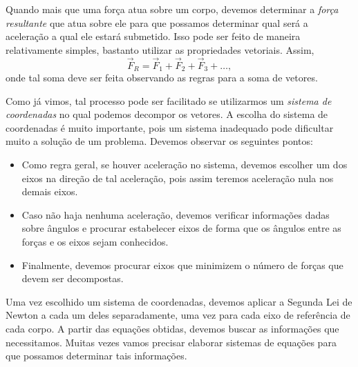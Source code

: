 Quando mais que uma força atua sobre um corpo, devemos determinar a \emph{força resultante} que atua sobre ele para que possamos determinar qual será a aceleração a qual ele estará submetido. Isso pode ser feito de maneira relativamente simples, bastanto utilizar as propriedades vetoriais. Assim,
\begin{equation}
    \vec{F}_R = \vec{F}_1 + \vec{F}_2 + \vec{F}_3 + \dots,
\end{equation}
%
onde tal soma deve ser feita observando as regras para a soma de vetores.

Como já vimos, tal processo pode ser facilitado se utilizarmos um \emph{sistema de coordenadas} no qual podemos decompor os vetores. A escolha do sistema de coordenadas é muito importante, pois um sistema inadequado pode dificultar muito a solução de um problema. Devemos observar os seguintes pontos:
\begin{itemize}
    \item Como regra geral, se houver aceleração no sistema, devemos escolher um dos eixos na direção de tal aceleração, pois assim teremos aceleração nula nos demais eixos.
    \item Caso não haja nenhuma aceleração, devemos verificar informações dadas sobre ângulos e procurar estabelecer eixos de forma que os ângulos entre as forças e os eixos sejam conhecidos.
    \item Finalmente, devemos procurar eixos que minimizem o número de forças que devem ser decompostas.
\end{itemize}
%
Uma vez escolhido um sistema de coordenadas, devemos aplicar a Segunda Lei de Newton a cada um deles separadamente, uma vez para cada eixo de referência de cada corpo. A partir das equações obtidas, devemos buscar as informações que necessitamos. Muitas vezes vamos precisar elaborar sistemas de equações para que possamos determinar tais informações.

